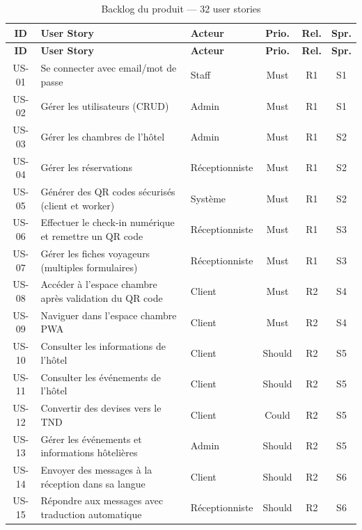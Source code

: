 
\begin{longtable}{|c|p{8.5cm}|p{2cm}|c|c|c|}
\caption{Backlog du produit — 32 user stories} \label{tab:backlog} \\
\hline
\textbf{ID} & \textbf{User Story} & \textbf{Acteur} & \textbf{Prio.} & \textbf{Rel.} & \textbf{Spr.} \\
\hline
\endfirsthead
\hline
\textbf{ID} & \textbf{User Story} & \textbf{Acteur} & \textbf{Prio.} & \textbf{Rel.} & \textbf{Spr.} \\
\hline
\endhead
US-01 & Se connecter avec email/mot de passe & Staff & Must & R1 & S1 \\
\hline
US-02 & Gérer les utilisateurs (CRUD) & Admin & Must & R1 & S1 \\
\hline
US-03 & Gérer les chambres de l'hôtel & Admin & Must & R1 & S2 \\
\hline
US-04 & Gérer les réservations & Réceptionniste & Must & R1 & S2 \\
\hline
US-05 & Générer des QR codes sécurisés (client et worker) & Système & Must & R1 & S2 \\
\hline
US-06 & Effectuer le check-in numérique et remettre un QR code & Réceptionniste & Must & R1 & S3 \\
\hline
US-07 & Gérer les fiches voyageurs (multiples formulaires) & Réceptionniste & Must & R1 & S3 \\
\hline
US-08 & Accéder à l'espace chambre après validation du QR code & Client & Must & R2 & S4 \\
\hline
US-09 & Naviguer dans l'espace chambre PWA & Client & Must & R2 & S4 \\
\hline
US-10 & Consulter les informations de l'hôtel & Client & Should & R2 & S5 \\
\hline
US-11 & Consulter les événements de l'hôtel & Client & Should & R2 & S5 \\
\hline
US-12 & Convertir des devises vers le TND & Client & Could & R2 & S5 \\
\hline
US-13 & Gérer les événements et informations hôtelières & Admin & Should & R2 & S5 \\
\hline
US-14 & Envoyer des messages à la réception dans sa langue & Client & Should & R2 & S6 \\
\hline
US-15 & Répondre aux messages avec traduction automatique & Réceptionniste & Should & R2 & S6 \\

\end{longtable}

